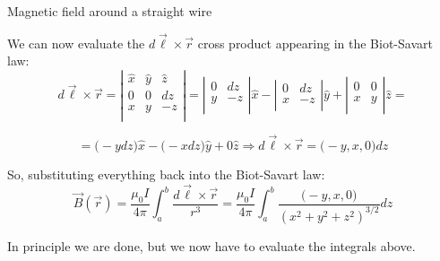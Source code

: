 \begin{frame}{Magnetic field around a straight wire}

We can now evaluate the $d\vec{\ell} \times \vec{r}$ cross product appearing in the Biot-Savart law:\\
\begin{equation*}
  d\vec{\ell} \times \vec{r} =
   \left|
    \begin{array}{ccc}
      \hat{x} & \hat{y} & \hat{z} \\
            0 &       0 &      dz \\
            x &       y &      -z \\
    \end{array}
   \right|
   =
   \left|
    \begin{array}{cc}
            0 &  dz \\
            y &  -z \\
    \end{array}
   \right|
   \hat{x} -
   \left|
    \begin{array}{cc}
            0 &  dz \\
            x &  -z \\
    \end{array}
   \right|
   \hat{y} +
   \left|
    \begin{array}{cc}
            0 &  0 \\
            x &  y \\
    \end{array}
   \right|
   \hat{z} =
\end{equation*}

\begin{equation*}
  = \Big( -y dz \Big) \hat{x} - \Big( -x dz \Big) \hat{y} + 0 \hat{z} \Rightarrow
  d\vec{\ell} \times \vec{r} = \Big(-y, x, 0 \Big) dz
\end{equation*}

So, substituting everything back into the Biot-Savart law:
\begin{equation*}
  \vec{B}(\vec{r}) =
     \frac{\mu_0I}{4\pi} \int_{a}^{b} \frac{d\vec{\ell} \times \vec{r}}{r^3} =
     \frac{\mu_0I}{4\pi} \int_{a}^{b} \frac{\Big(-y, x, 0 \Big)}{(x^2+y^2+z^2)^{3/2}} dz
\end{equation*}

In principle we are done, but we now have to evaluate the integrals above.

\end{frame}

%
%
%

